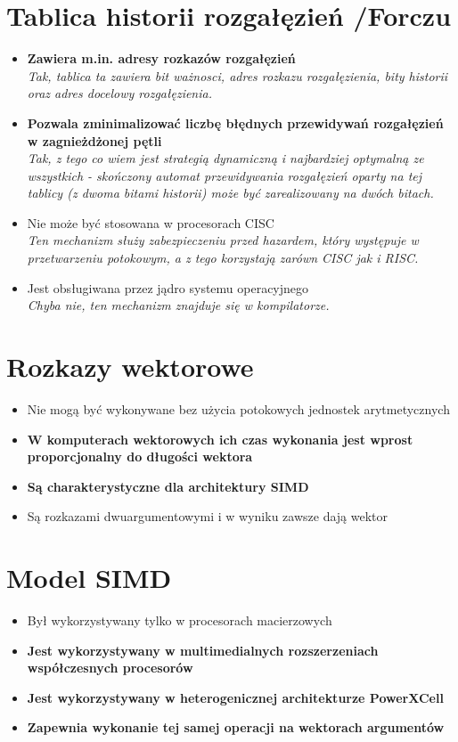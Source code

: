 \documentclass[a4paper,twoside]{article}
\begin{document}
\section{Tablica historii rozgałęzień {\small /Forczu}}
	\begin{itemize}
    \item \textbf{Zawiera m.in. adresy rozkazów rozgałęzień}\\
    {\small \emph{Tak, tablica ta zawiera bit ważnosci, \emph{adres rozkazu rozgałęzienia}, bity historii oraz \emph{adres docelowy rozgałęzienia}.}}
    \item \textbf{Pozwala zminimalizować liczbę błędnych przewidywań rozgałęzień w zagnieżdżonej pętli}\\
    {\small \emph{Tak, z tego co wiem jest strategią dynamiczną i najbardziej optymalną ze wszystkich - skończony automat przewidywania rozgałęzień oparty na tej tablicy (z dwoma bitami historii) może być zarealizowany na dwóch bitach.}}
    \item Nie może być stosowana w procesorach CISC\\
    {\small \emph{Ten mechanizm służy zabezpieczeniu przed hazardem, który występuje w przetwarzeniu potokowym, a z tego korzystają zarówn CISC jak i RISC.}}
    \item Jest obsługiwana przez jądro systemu operacyjnego\\
    {\small \emph{Chyba nie, ten mechanizm znajduje się w kompilatorze.}}
    \end{itemize}

\section{Rozkazy wektorowe}
	\begin{itemize}
    \item Nie mogą być wykonywane bez użycia potokowych jednostek arytmetycznych
    \item \textbf{W komputerach wektorowych ich czas wykonania jest wprost proporcjonalny do długości wektora}
    \item \textbf{Są charakterystyczne dla architektury SIMD}
    \item Są rozkazami dwuargumentowymi i w wyniku zawsze dają wektor
    \end{itemize}

\section{Model SIMD}
	\begin{itemize}
    \item Był wykorzystywany tylko w procesorach macierzowych
    \item \textbf{Jest wykorzystywany w multimedialnych rozszerzeniach współczesnych procesorów}
    \item \textbf{Jest wykorzystywany w heterogenicznej architekturze PowerXCell}
    \item \textbf{Zapewnia wykonanie tej samej operacji na wektorach argumentów}
    \end{itemize}
\end{document}
